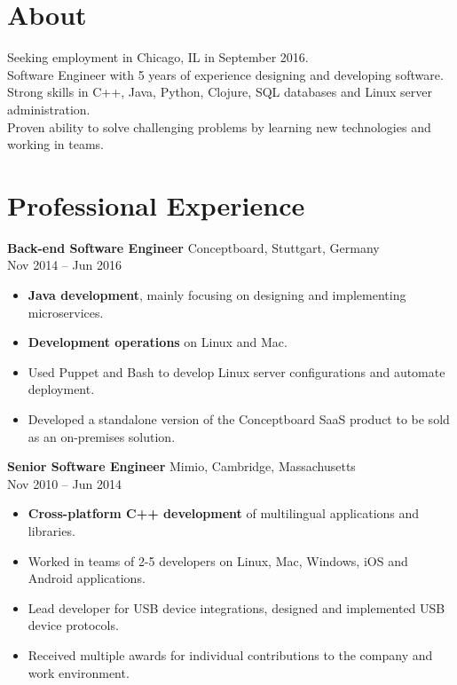 \documentclass{article}
\begin{document}
\maketitle

\section*{About}
Seeking employment in Chicago, IL in September 2016.\\
Software Engineer with 5 years of experience designing and developing software.\\
Strong skills in C++, Java, Python, Clojure, SQL databases and Linux server administration.\\
Proven ability to solve challenging problems by learning new technologies and working in teams.\\
\section*{Professional Experience}
{\bf Back-end Software Engineer} Conceptboard, Stuttgart, Germany\\
Nov 2014 -- Jun 2016
\begin{itemize}
  \itemsep0em
  \item {\bf Java development}, mainly focusing on designing and implementing microservices.
  \item {\bf Development operations} on Linux and Mac.
  \item Used Puppet and Bash to develop Linux server configurations and automate deployment.
  \item Developed a standalone version of the Conceptboard SaaS product to be sold as an on-premises solution.\\
\end{itemize}
{\bf Senior Software Engineer} Mimio, Cambridge, Massachusetts\\
Nov 2010 -- Jun 2014
\begin{itemize}
  \itemsep0em
  \item {\bf Cross-platform C++ development} of multilingual applications and libraries.
  \item Worked in teams of 2-5 developers on Linux, Mac, Windows, iOS and Android applications.
  \item Lead developer for USB device integrations, designed and implemented USB device protocols.
  \item Received multiple awards for individual contributions to the company and work environment.\\
\end{itemize}
\end{document}
